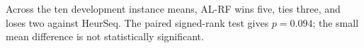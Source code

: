 Across the ten development instance means, AL-RF wins five, ties three, and loses two against HeurSeq. The paired signed-rank test gives $p=0.094$; the small mean difference is not statistically significant.
